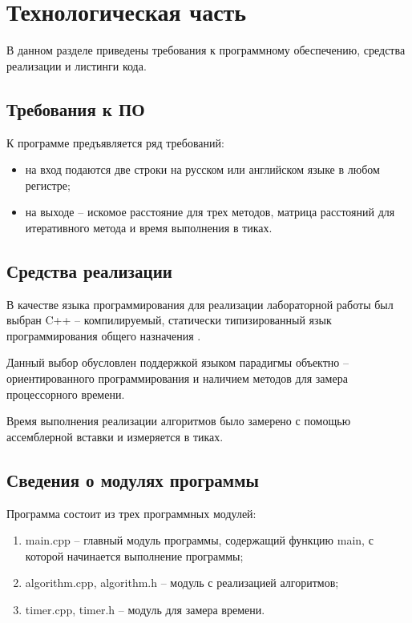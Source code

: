\chapter{Технологическая часть}

В данном разделе приведены требования к программному обеспечению, средства реализации и листинги кода.

\section{Требования к ПО}

К программе предъявляется ряд требований:
\begin{itemize}
	\item на вход подаются две строки на русском или английском языке в любом регистре;
	\item на выходе -- искомое расстояние для трех методов, матрица расстояний для итеративного метода и время выполнения в тиках.
\end{itemize}

\section{Средства реализации}

В качестве языка программирования для реализации лабораторной работы был выбран C++ -- компилируемый, статически типизированный язык программирования общего назначения \cite{cpp}. 

Данный выбор обусловлен поддержкой языком парадигмы объектно -- ориентированного программирования и наличием методов для замера процессорного времени.

Время выполнения реализации алгоритмов было замерено с помощью ассемблерной вставки и измеряется в тиках.

\section{Сведения о модулях программы}
Программа состоит из трех программных модулей:
\begin{enumerate}[label={\arabic*)}]
	\item main.cpp -- главный модуль программы, содержащий функцию main, с которой начинается выполнение программы;
	\item algorithm.cpp, algorithm.h -- модуль с реализацией алгоритмов;
	\item timer.cpp, timer.h -- модуль для замера времени.
\end{enumerate}

